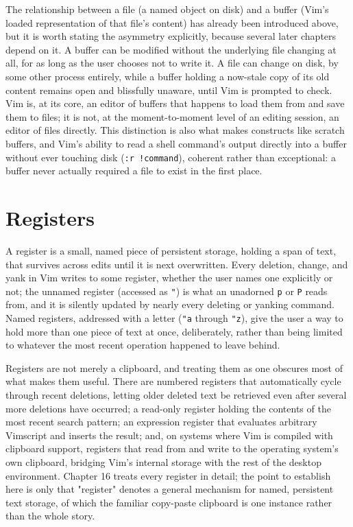 The relationship between a file (a named object on disk) and a buffer (Vim's loaded representation of that file's content) has already been introduced above, but it is worth stating the asymmetry explicitly, because several later chapters depend on it. A buffer can be modified without the underlying file changing at all, for as long as the user chooses not to write it. A file can change on disk, by some other process entirely, while a buffer holding a now-stale copy of its old content remains open and blissfully unaware, until Vim is prompted to check. Vim is, at its core, an editor of buffers that happens to load them from and save them to files; it is not, at the moment-to-moment level of an editing session, an editor of files directly. This distinction is also what makes constructs like scratch buffers, and Vim's ability to read a shell command's output directly into a buffer without ever touching disk (\texttt{:r !command}), coherent rather than exceptional: a buffer never actually required a file to exist in the first place.

\section{Registers}

A register is a small, named piece of persistent storage, holding a span of text, that survives across edits until it is next overwritten. Every deletion, change, and yank in Vim writes to some register, whether the user names one explicitly or not; the unnamed register (accessed as \texttt{"}) is what an unadorned \texttt{p} or \texttt{P} reads from, and it is silently updated by nearly every deleting or yanking command. Named registers, addressed with a letter (\texttt{"a} through \texttt{"z}), give the user a way to hold more than one piece of text at once, deliberately, rather than being limited to whatever the most recent operation happened to leave behind.

Registers are not merely a clipboard, and treating them as one obscures most of what makes them useful. There are numbered registers that automatically cycle through recent deletions, letting older deleted text be retrieved even after several more deletions have occurred; a read-only register holding the contents of the most recent search pattern; an expression register that evaluates arbitrary Vimscript and inserts the result; and, on systems where Vim is compiled with clipboard support, registers that read from and write to the operating system's own clipboard, bridging Vim's internal storage with the rest of the desktop environment. Chapter 16 treats every register in detail; the point to establish here is only that "register" denotes a general mechanism for named, persistent text storage, of which the familiar copy-paste clipboard is one instance rather than the whole story.

